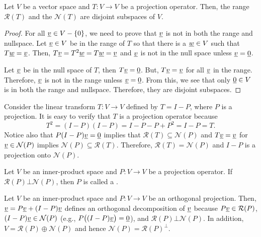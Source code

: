 \begin{theorem}
Let $V$ be a vector space and $T \colon V \rightarrow V$ be a projection operator.
Then, the range $\mathcal{R}(T)$ and the $\mathcal{N}(T)$ are disjoint subspaces of $V$.
\end{theorem}
\begin{proof}
For all $\underline{v} \in V - \{0\}$, we need to prove that $\underline{v}$ is not in both the range and nullspace.
Let $\underline{v}\in V$ be in the range of $T$ so that there is a $\underline{w}\in V$ such that $T \underline{w} = \underline{v}$.
Then, $T \underline{v} = T^2 \underline{w} = T \underline{w} = \underline{v}$ and $\underline{v}$ is not in the null space unless $\underline{v} = \underline{0}$.

Let $\underline{v}$ be in the null space of $T$, then $T \underline{v} = \underline{0}$.
But, $T \underline{v} = \underline{v}$ for all $\underline{v}$ in the range.
Therefore, $\underline{v}$ is not in the range unless $\underline{v} = \underline{0}$.
From this, we see that only $\underline{0}\in V$ is in both the range and nullspace.
Therefore, they are disjoint subspaces.
\end{proof}

\begin{example}
Consider the linear transform $T \colon V \rightarrow V$ defined by $T = I - P$, where $P$ is a projection.
It is easy to verify that $T$ is a projection operator because
\[ T^2 = (I-P)(I-P) = I - P- P + P^2 = I-P = T .\]
Notice also that $P(I-P) \underline{v} = \underline{0}$ implies that $\mathcal{R}(T) \subseteq \mathcal{N}(P)$ and $T \underline{v} = \underline{v}$ for $\underline{v} \in \mathcal{N}(P)$ implies $\mathcal{N}(P) \subseteq \mathcal{R}(T)$.
Therefore, $\mathcal{R}(T) = \mathcal{N}(P)$ and $I-P$ is a projection onto $\mathcal{N}(P)$.
\end{example}

\begin{definition}
\label{definition:OrthogonalProjection}
Let $V$ be an inner-product space and $P \colon V \rightarrow V$ be a projection operator.
If $\mathcal{R}(P) \bot \mathcal{N}(P)$, then $P$ is called a  .
\end{definition}

\begin{example}
Let $V$ be an inner-product space and $P \colon V \rightarrow V$ be an orthogonal projection.
Then, $\underline{v} = P \underline{v} + (I-P) \underline{v}$ defines an orthogonal decomposition of $\underline{v}$ because $P \underline{v} \in \mathcal{R}(P)$, $(I-P) \underline{v} \in \mathcal{N}(P)$ (e.g., $P\big((I-P)\underline{v}\big)=\underline{0}$), and $\mathcal{R}(P) \bot \mathcal{N}(P)$.
In addition, $V = \mathcal{R}(P) \oplus \mathcal{N}(P)$ and hence $\mathcal{N}(P) = \mathcal{R}(P)^{\bot}$.
\end{example}

